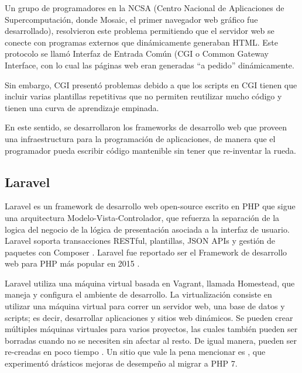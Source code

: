 Un grupo de programadores en la NCSA (Centro Nacional de Aplicaciones de Supercomputación, donde Mosaic, el primer navegador web gráfico fue desarrollado), resolvieron este problema permitiendo que el servidor web se conecte con programas externos que dinámicamente generaban HTML. Este protocolo se llamó Interfaz de Entrada Común (CGI o Common Gateway Interface, con lo cual las páginas web eran generadas “a pedido” dinámicamente. 

Sin embargo, CGI presentó problemas debido a que los scripts en CGI tienen que incluir varias plantillas repetitivas que no permiten reutilizar mucho código y tienen una curva de aprendizaje empinada.

En este sentido, se desarrollaron los frameworks de desarrollo web que proveen una infraestructura para la programación de aplicaciones, de manera que el programador pueda escribir código mantenible sin tener que re-inventar la rueda. \cite{Holovaty2016-nm}


\subsection{Laravel}
Laravel es un framework de desarrollo web open-source escrito en PHP que sigue una arquitectura Modelo-Vista-Controlador, que refuerza la separación de la logica del negocio de la lógica de presentación asociada a la interfaz de usuario. Laravel soporta transacciones RESTful, plantillas, JSON APIs y gestión de paquetes con Composer \cite{Bean2015-zt}. Laravel fue reportado ser el Framework de desarrollo web para PHP más popular en 2015 \cite{SitePoint2015-yl}.

Laravel utiliza una máquina virtual basada en Vagrant, llamada Homestead, que maneja y configura el ambiente de desarrollo. La virtualización consiste en utilizar una máquina virtual para correr un servidor web, una base de datos y scripts; es decir, desarrollar aplicaciones y sitios web dinámicos. Se pueden crear múltiples máquinas virtuales para varios proyectos, las cuales también pueden ser borradas cuando no se necesiten sin afectar al resto.  De igual manera, pueden ser re-creadas en poco tiempo \cite{Wu2016-ws}. Un sitio que vale la pena mencionar es , que experimentó drásticos mejoras de desempeño al migrar a PHP 7. 

